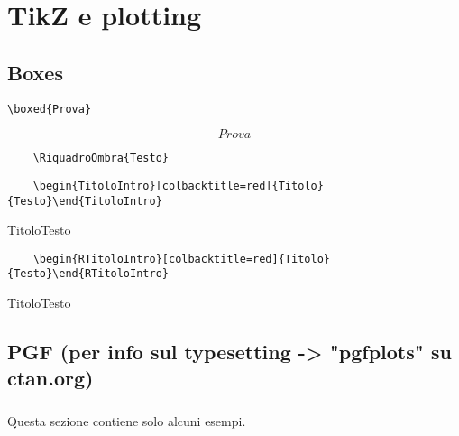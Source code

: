 \chapter{TikZ e plotting}
\section{Boxes}
\begin{verbatim}
\boxed{Prova}
\end{verbatim}
$$\boxed{Prova}$$

\begin{verbatim}
	\RiquadroOmbra{Testo}
\end{verbatim}

\begin{verbatim}
	\begin{TitoloIntro}[colbacktitle=red]{Titolo}{Testo}\end{TitoloIntro}
\end{verbatim}
\begin{TitoloIntro}[colbacktitle=red, width=\textwidth]{Titolo}{Testo}\end{TitoloIntro}

\begin{verbatim}
	\begin{RTitoloIntro}[colbacktitle=red]{Titolo}{Testo}\end{RTitoloIntro}
\end{verbatim}
\begin{RTitoloIntro}[colbacktitle=red]{Titolo}{Testo}\end{RTitoloIntro}
\newpage
\section{PGF (per info sul typesetting -> "pgfplots" su ctan.org)}
\paragraph*{} Questa sezione contiene solo alcuni esempi.

